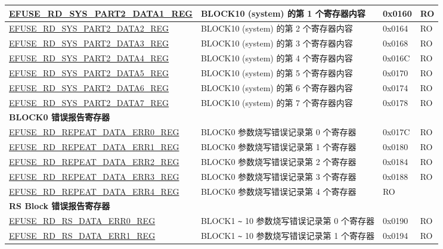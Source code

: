 \begin{longtable}{ | p{7cm} | p{7.2cm} | p{1.3cm} | p{1cm} | }
\hyperref[regdesc:EFUSERDSYSPART2DATANREG]{EFUSE\_RD\_SYS\_PART2\_DATA1\_REG} & BLOCK10 (system) 的第 1 个寄存器内容 & 0x0160 & RO \\ \hline
\hyperref[regdesc:EFUSERDSYSPART2DATANREG]{EFUSE\_RD\_SYS\_PART2\_DATA2\_REG} & BLOCK10 (system) 的第 2 个寄存器内容 & 0x0164 & RO \\ \hline
\hyperref[regdesc:EFUSERDSYSPART2DATANREG]{EFUSE\_RD\_SYS\_PART2\_DATA3\_REG} & BLOCK10 (system) 的第 3 个寄存器内容 & 0x0168 & RO \\ \hline
\hyperref[regdesc:EFUSERDSYSPART2DATANREG]{EFUSE\_RD\_SYS\_PART2\_DATA4\_REG} & BLOCK10 (system) 的第 4 个寄存器内容 & 0x016C & RO \\ \hline
\hyperref[regdesc:EFUSERDSYSPART2DATANREG]{EFUSE\_RD\_SYS\_PART2\_DATA5\_REG} & BLOCK10 (system) 的第 5 个寄存器内容 & 0x0170 & RO \\ \hline
\hyperref[regdesc:EFUSERDSYSPART2DATANREG]{EFUSE\_RD\_SYS\_PART2\_DATA6\_REG} & BLOCK10 (system) 的第 6 个寄存器内容 & 0x0174 & RO \\ \hline
\hyperref[regdesc:EFUSERDSYSPART2DATANREG]{EFUSE\_RD\_SYS\_PART2\_DATA7\_REG} & BLOCK10 (system) 的第 7 个寄存器内容 & 0x0178 & RO \\ \hline
\multicolumn{4}{|l|}{\textbf{BLOCK0 错误报告寄存器}} \\ \hline
\hyperref[regdesc:EFUSERDREPEATDATAERR0REG]{EFUSE\_RD\_REPEAT\_DATA\_ERR0\_REG} & BLOCK0 参数烧写错误记录第 0 个寄存器 & 0x017C & RO \\ \hline
\hyperref[regdesc:EFUSERDREPEATDATAERR1REG]{EFUSE\_RD\_REPEAT\_DATA\_ERR1\_REG} & BLOCK0 参数烧写错误记录第 1 个寄存器 & 0x0180 & RO \\ \hline
\hyperref[regdesc:EFUSERDREPEATDATAERR2REG]{EFUSE\_RD\_REPEAT\_DATA\_ERR2\_REG} & BLOCK0 参数烧写错误记录第 2 个寄存器 & 0x0184 & RO \\ \hline
\hyperref[regdesc:EFUSERDREPEATDATAERR3REG]{EFUSE\_RD\_REPEAT\_DATA\_ERR3\_REG} & BLOCK0 参数烧写错误记录第 3 个寄存器 & 0x0188 & RO \\ \hline
\hyperref[regdesc:EFUSERDREPEATDATAERR4REG]{EFUSE\_RD\_REPEAT\_DATA\_ERR4\_REG} & BLOCK0 参数烧写错误记录第 4 个寄存器 & RO \\ \hline
\multicolumn{4}{|l|}{\textbf{RS Block 错误报告寄存器}} \\ \hline
\hyperref[regdesc:EFUSERDRSDATAERR0REG]{EFUSE\_RD\_RS\_DATA\_ERR0\_REG} & BLOCK1 \verb+~+ 10 参数烧写错误记录第 0 个寄存器 & 0x0190 & RO \\ \hline
\hyperref[regdesc:EFUSERDRSDATAERR1REG]{EFUSE\_RD\_RS\_DATA\_ERR1\_REG} & BLOCK1 \verb+~+ 10 参数烧写错误记录第 1 个寄存器 & 0x0194 & RO \\ \hline

\end{longtable}
